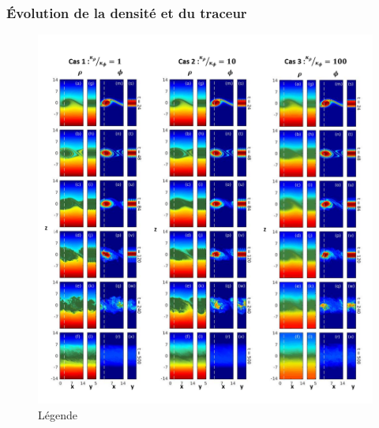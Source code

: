 \documentclass[a4paper,12pt]{article}
\begin{document}
    \subsubsection{Évolution de la densité et du traceur}

    \begin{figure}[!h]
        \centering
        \label{rhodiff}
        \includegraphics[width=0.95\linewidth]{figures/rhodiff_contour.png}
        \caption{Légende}
    \end{figure}
    
\end{document}
